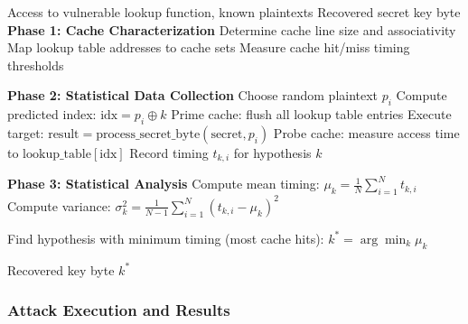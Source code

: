 \documentclass[11pt,a4paper]{article}
\theoremstyle{definition}
\begin{document}
\begin{algorithm}
\caption{Simple Cache-Timing Attack}
\begin{algorithmic}[1]
\REQUIRE Access to vulnerable lookup function, known plaintexts
\ENSURE Recovered secret key byte
\STATE \textbf{Phase 1: Cache Characterization}
\STATE Determine cache line size and associativity
\STATE Map lookup table addresses to cache sets
\STATE Measure cache hit/miss timing thresholds

\STATE \textbf{Phase 2: Statistical Data Collection}
        \STATE Choose random plaintext $p_i$
        \STATE Compute predicted index: $\text{idx} = p_i \oplus k$
        \STATE Prime cache: flush all lookup table entries
        \STATE Execute target: $\text{result} = \text{process\_secret\_byte}(\text{secret}, p_i)$
        \STATE Probe cache: measure access time to $\text{lookup\_table}[\text{idx}]$
        \STATE Record timing $t_{k,i}$ for hypothesis $k$
    \ENDFOR
\ENDFOR

\STATE \textbf{Phase 3: Statistical Analysis}
    \STATE Compute mean timing: $\mu_k = \frac{1}{N} \sum_{i=1}^N t_{k,i}$
    \STATE Compute variance: $\sigma_k^2 = \frac{1}{N-1} \sum_{i=1}^N (t_{k,i} - \mu_k)^2$
\ENDFOR

\STATE Find hypothesis with minimum timing (most cache hits):
\STATE $k^* = \arg\min_k \mu_k$

\RETURN Recovered key byte $k^*$
\end{algorithmic}
\end{algorithm}

\subsubsection{Attack Execution and Results}
\end{document}
